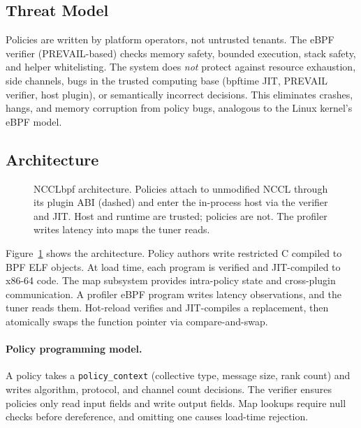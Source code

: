 \documentclass[sigplan,10pt]{acmart}
\newcommand{\sysname}{NCCLbpf\xspace}
\begin{document}
\subsection{Threat Model}
\label{sec:threat-model}

Policies are written by platform operators, not untrusted tenants.
The eBPF verifier (PREVAIL-based) checks memory safety, bounded
execution, stack safety, and helper whitelisting. The system does
\emph{not} protect against resource exhaustion, side channels, bugs in
the trusted computing base (bpftime JIT, PREVAIL verifier, host
plugin), or semantically incorrect decisions. This eliminates crashes, hangs, and memory corruption from policy
bugs, analogous to the Linux kernel's eBPF model.

\subsection{Architecture}

\begin{figure}[t]
  \centering
  
  \caption{\sysname architecture. Policies attach to unmodified NCCL
  through its plugin ABI (dashed) and enter the in-process host via the
  verifier and JIT. Host and runtime are trusted; policies are not. The
  profiler writes latency into maps the tuner reads.}
  \label{fig:architecture}
\end{figure}

Figure~\ref{fig:architecture} shows the architecture. Policy authors
write restricted C compiled to BPF ELF objects. At load time, each
program is verified and JIT-compiled to x86-64 code. The map subsystem provides
intra-policy state and cross-plugin communication. A profiler eBPF
program writes latency observations, and the tuner reads them. Hot-reload
verifies and JIT-compiles a replacement, then atomically swaps the
function pointer via compare-and-swap.

\paragraph{Policy programming model.}
A policy takes a \texttt{policy\_context} (collective type, message
size, rank count) and writes algorithm, protocol, and channel count
decisions. The verifier ensures policies only read input fields and
write output fields. Map lookups require null checks before
dereference, and omitting one causes load-time rejection.
\end{document}
